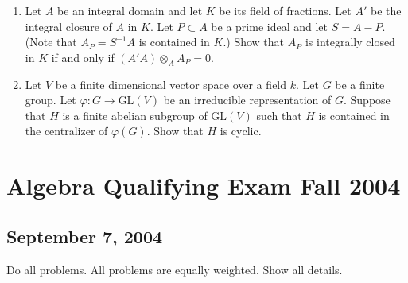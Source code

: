 \documentclass{article}
\begin{document}
\begin{enumerate}
    \item Let \(A\) be an integral domain and let \(K\) be its field of fractions. Let \(A'\) be the integral closure of \(A\) in \(K\). Let \(P \subset A\) be a prime ideal and let \(S = A - P\). (Note that \(A_P = S^{-1}A\) is contained in \(K\).) Show that \(A_P\) is integrally closed in \(K\) if and only if \((A'A) \otimes_A A_P = 0\).

    \item Let \(V\) be a finite dimensional vector space over a field \(k\). Let \(G\) be a finite group. Let \(\varphi : G \rightarrow \text{GL}(V)\) be an irreducible representation of \(G\). Suppose that \(H\) is a finite abelian subgroup of \(\text{GL}(V)\) such that \(H\) is contained in the centralizer of \(\varphi(G)\). Show that \(H\) is cyclic.
\end{enumerate}

\section*{Algebra Qualifying Exam Fall 2004}
\subsection*{September 7, 2004}

Do all problems. All problems are equally weighted. Show all details.
\end{document}
